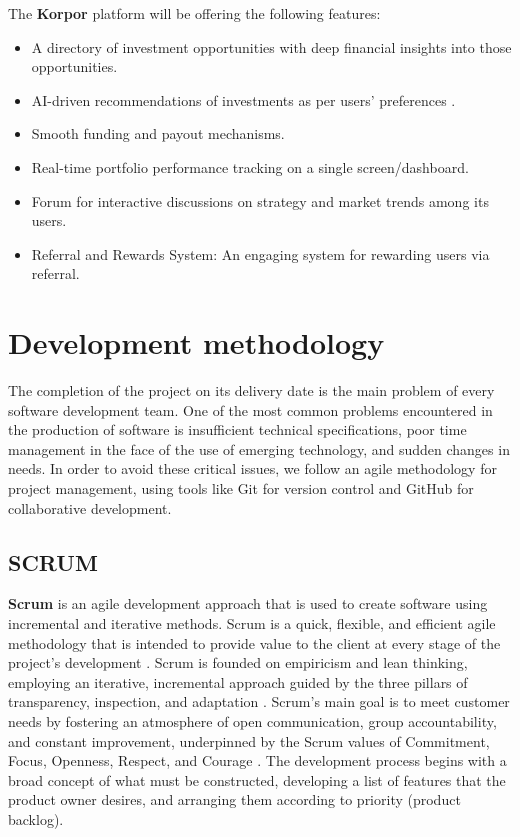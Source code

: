 The \textbf{\textcolor{primary}{Korpor}} platform will be offering the following features:

\begin{itemize}
    \item A directory of investment opportunities with deep financial insights into those opportunities.
    \item AI-driven recommendations of investments as per users' preferences \cite{LinkedInAIFinTech2024}.
    \item Smooth funding and payout mechanisms.
    \item Real-time portfolio performance tracking on a single screen/dashboard.
    \item Forum for interactive discussions on strategy and market trends among its users.
    \item Referral and Rewards System: An engaging system for rewarding users via referral.
\end{itemize}

\section{Development methodology}

The completion of the project on its delivery date is the main problem of every software development team. One of the most common problems encountered in the production of software is insufficient technical specifications, poor time management in the face of the use of emerging technology, and sudden changes in needs. In order to avoid these critical issues, we follow an agile methodology for project management, using tools like Git \cite{GitWebsite} for version control and GitHub \cite{GithubWebsite} for collaborative development.

\subsection{SCRUM}

\textbf{\textcolor{primary}{Scrum}} is an agile development approach that is used to create software using incremental and iterative methods. Scrum is a quick, flexible, and efficient agile methodology that is intended to provide value to the client at every stage of the project's development \cite{ScrumGuide2020}. Scrum is founded on empiricism and lean thinking, employing an iterative, incremental approach guided by the three pillars of transparency, inspection, and adaptation \cite{AtlassianScrumPillars, ScrumGuide2020}. Scrum's main goal is to meet customer needs by fostering an atmosphere of open communication, group accountability, and constant improvement, underpinned by the Scrum values of Commitment, Focus, Openness, Respect, and Courage \cite{ScrumGuide2020}. The development process begins with a broad concept of what must be constructed, developing a list of features that the product owner desires, and arranging them according to priority (product backlog).


